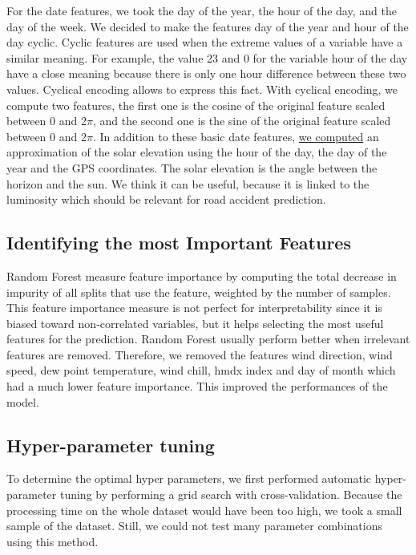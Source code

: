 \documentclass[conference]{IEEEtran}
\begin{document}
For the date features, we took the day of the year, the hour of the day,
and the day of the week. We decided to make the features day of the year
and hour of the day cyclic. Cyclic features are used when the extreme values
of a variable have a similar meaning. For example, the value 23 and 0 for
the variable hour of the day have a close meaning because there is only one
hour difference between these two values. Cyclical encoding allows to express
this fact. With cyclical encoding, we compute two features, the first one is
the cosine of the original feature scaled between 0 and 2$\pi$, and the second
one is the sine of the original feature scaled between 0 and 2$\pi$.
In addition to these basic date features, \href{https://github.com/big-data-lab-team/accident-prediction-montreal/blob/master/solar\_features.py}{we computed} an approximation
of the solar elevation using the hour of the day, the day of the year
and the GPS coordinates. The solar elevation is the angle 
between the horizon and the sun. We think it can be useful, because it is
linked to the luminosity which should be relevant for road accident prediction.

\subsection{Identifying the most Important Features}

Random Forest measure feature importance by computing the total
decrease in impurity of all splits that use the feature, weighted by the
number of samples. This feature importance measure is not perfect for
interpretability since it is biased toward non-correlated variables, but it
helps selecting the most useful features for the prediction. 
Random Forest usually perform better when irrelevant features are removed.
Therefore, we removed the features wind direction, wind speed, dew
point temperature, wind chill, hmdx index and day of month which had a
much lower feature importance. This improved the performances of the model.

\subsection{Hyper-parameter tuning}

To determine the optimal hyper parameters, we first performed
automatic hyper-parameter tuning by performing a grid search 
with cross-validation. Because the processing time on the whole dataset would
have been too high, we took a small sample of the dataset. Still, we could
not test many parameter combinations using this method.
\end{document}
